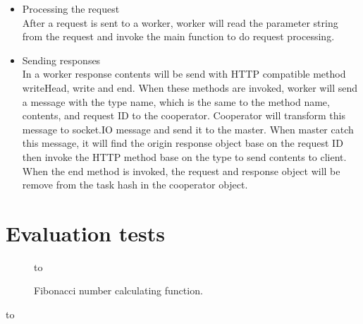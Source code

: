 \documentclass[JIP]{ipsj}
\begin{document}
\begin{itemize}
\item Processing the request\\
After a request is sent to a worker, worker will read the parameter string from the request and invoke the main function to do request processing.

\item Sending responses\\
In a worker response contents will be send with HTTP compatible method writeHead, write and end. When these methods are invoked, worker will send a message with the type name, which is the same to the method name, contents, and request ID to the cooperator. Cooperator will transform this message to socket.IO message and send it to the master. When master catch this message, it will find the origin response object base on the request ID then invoke the HTTP method base on the type to send contents to client. When the end method is invoked, the request and response object will be remove from the task hash in the cooperator object.

\end{itemize}


\section{Evaluation tests}





\begin{figure}[tb]
	\hbox to
	\caption{Fibonacci number calculating function.} 
	\label{fig:fib_func} 
\end{figure}

\begin{table}[tb]
\caption{Environment of benchmark test.}
\label{env}
\centering
	\hbox to
\end{table}
\end{document}
